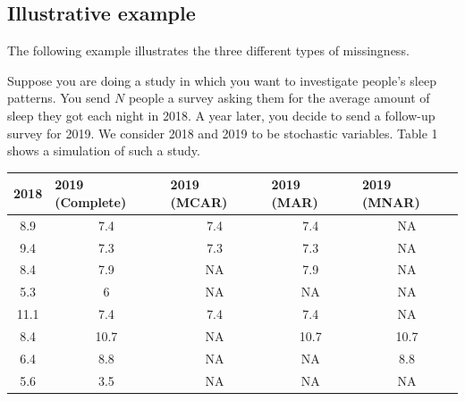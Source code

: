 \documentclass{article}
\begin{document}
	\subsection{Illustrative example}
	
	The following example illustrates the three different types of missingness.
	
	Suppose you are doing a study in which you want to investigate people's sleep patterns. You send $N$ people a survey asking them for the average amount of sleep they got each night in 2018. A year later, you decide to send a follow-up survey for 2019. We consider 2018 and 2019 to be stochastic variables. Table 1 shows a simulation of such a study.
	
	\begin{table}[]
		\begin{tabular}{ccccc}
			\multicolumn{1}{l}{2018} & \multicolumn{1}{l}{2019 (Complete)} & \multicolumn{1}{l}{2019 (MCAR)} & \multicolumn{1}{l}{2019 (MAR)} & \multicolumn{1}{l}{2019 (MNAR)} \\ \hline
			8.9                      & 7.4                                 & 7.4                             & 7.4                            & NA                              \\
			9.4                      & 7.3                                 & 7.3                             & 7.3                            & NA                              \\
			8.4                      & 7.9                                 & NA                              & 7.9                            & NA                              \\
			5.3                      & 6                                   & NA                              & NA                             & NA                              \\
			11.1                     & 7.4                                 & 7.4                             & 7.4                            & NA                              \\
			8.4                      & 10.7                                & NA                              & 10.7                           & 10.7                            \\
			6.4                      & 8.8                                 & NA                              & NA                             & 8.8                             \\
			5.6                      & 3.5                                 & NA                              & NA                             & NA                              \\

\end{tabular}
\end{table}
\end{document}
